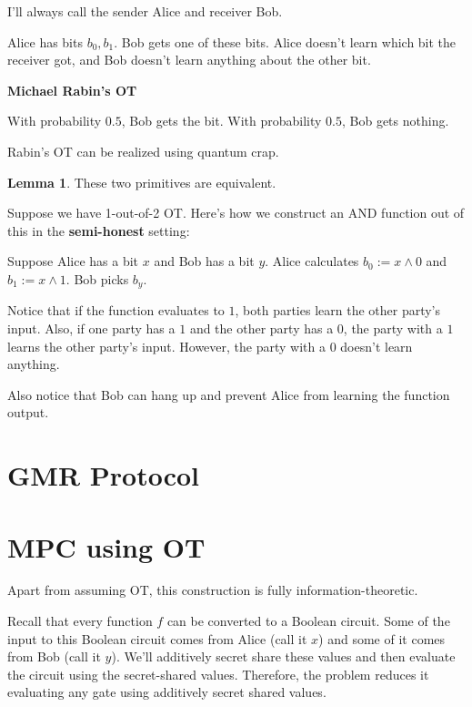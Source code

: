 \documentclass{article}
\theoremstyle{definition}
\newtheorem{lemma}[theorem]{Lemma}
\begin{document}
I'll always call the sender Alice and receiver Bob.

Alice has bits $b_{0}, b_{1}$. Bob gets one of these bits. Alice doesn't learn which bit the receiver got, and Bob doesn't learn anything about the other bit.


\textbf{Michael Rabin's OT}

With probability $0.5$, Bob gets the bit. With probability $0.5$, Bob gets nothing.

Rabin's OT can be realized using quantum crap. 

\begin{lemma}
    These two primitives are equivalent.
\end{lemma}

Suppose we have 1-out-of-2 OT. Here's how we construct an AND function out of this in the \textbf{semi-honest} setting:

Suppose Alice has a bit $x$ and Bob has a bit $y$. Alice calculates $b_{0} := x \land 0$ and $b_{1} := x \land 1$. Bob picks $b_{y}$. 

Notice that if the function evaluates to $1$, both parties learn the other party's input. Also, if one party has a $1$ and the other party has a $0$, the party with a $1$ learns the other party's input. However, the party with a $0$ doesn't learn anything.

Also notice that Bob can hang up and prevent Alice from learning the function output.


\newpage

\section{GMR Protocol}



\newpage

\section{MPC using OT}

Apart from assuming OT, this construction is fully information-theoretic.

Recall that every function $f$ can be converted to a Boolean circuit. Some of the input to this Boolean circuit comes from Alice (call it $x$) and some of it comes from Bob (call it $y$). We'll additively secret share these values and then evaluate the circuit using the secret-shared values. Therefore, the problem reduces it evaluating any gate using additively secret shared values.
\end{document}
